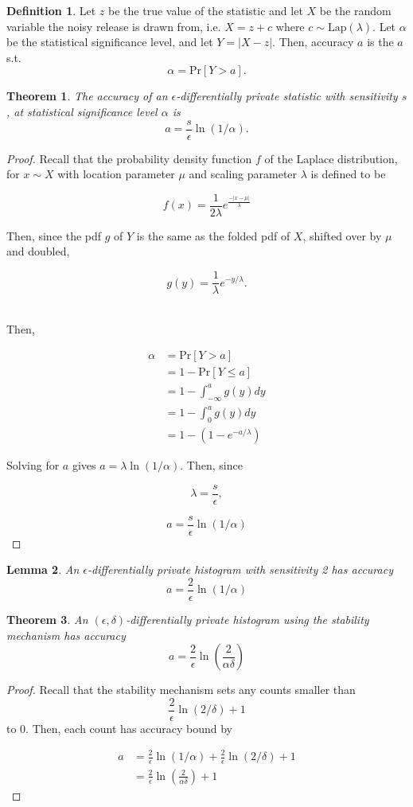 \documentclass[11pt, oneside]{article}   	%
\newtheorem{theorem}{Theorem}
\newtheorem{lemma}[theorem]{Lemma}
\theoremstyle{definition}
\newtheorem{definition}{Definition}
\newcommand{\lap}{\text{Lap}}
\newcommand{\pr}{\text{Pr}}
\begin{document}
\begin{definition}
Let $z$ be the true value of the statistic and let $X$ be the random variable the noisy release is drawn from, i.e. $X = z + c$ where $c \sim \lap(\lambda)$. Let $\alpha$ be the statistical significance level, and let $Y = \vert X-z \vert.$ Then, accuracy $a$ is the $a$ s.t.
$$ \alpha = \pr[Y > a].$$
\end{definition}

\begin{theorem}
The accuracy of an $\epsilon$-differentially private statistic with sensitivity $s$, at statistical significance level $\alpha$ is
$$ a = \frac{s}{\epsilon}\ln(1/\alpha).$$
\end{theorem}

\begin{proof}
Recall that the probability density function $f$ of the Laplace distribution, for $x \sim X$ with location parameter $\mu$ and scaling parameter $\lambda$ is defined to be

$$ f(x) = \frac{1}{2\lambda}e^{\frac{-\vert x-\mu \vert}{ \lambda}}$$

Then, since the pdf $g$ of $Y$ is the same as the folded pdf of $X$, shifted over by $\mu$ and doubled,

$$ g(y) = \frac{1}{\lambda}e^{-y/\lambda}.$$\

Then, 

\begin{align*}
\alpha &= \pr[Y>a] \\
	&= 1 - \pr[Y\le a]\\
	&= 1 - \int_{-\infty}^a g(y) dy \\
	&= 1 - \int_0^a g(y) dy \\
	&= 1 - (1-e^{-a/\lambda})
\end{align*}

Solving for $a$ gives $a = \lambda \ln (1/\alpha)$. Then, since 

$$\lambda = \frac{s}{\epsilon},$$

$$ a = \frac{s}{\epsilon}\ln(1/\alpha) $$
\end{proof}

\begin{lemma}
An $\epsilon$-differentially private histogram with sensitivity 2 has accuracy
$$ a = \frac{2}{\epsilon}\ln(1/\alpha)$$
\end{lemma}

\begin{theorem}
An $(\epsilon,\delta)$-differentially private histogram using the stability mechanism has accuracy
$$ a = \frac{2}{\epsilon}\ln(\frac{2}{\alpha\delta})$$
\end{theorem}

\begin{proof}
Recall that the stability mechanism sets any counts smaller than 
$$ \frac{2}{\epsilon} \ln(2/\delta) + 1 $$
to 0. Then, each count has accuracy bound by 

\begin{align*}
a &= \frac{2}{\epsilon}\ln(1/\alpha) +  \frac{2}{\epsilon}\ln(2/\delta) + 1\\
	&= \frac{2}{\epsilon} \ln(\frac{2}{\alpha\delta}) + 1
\end{align*}

\end{proof}
\end{document}
